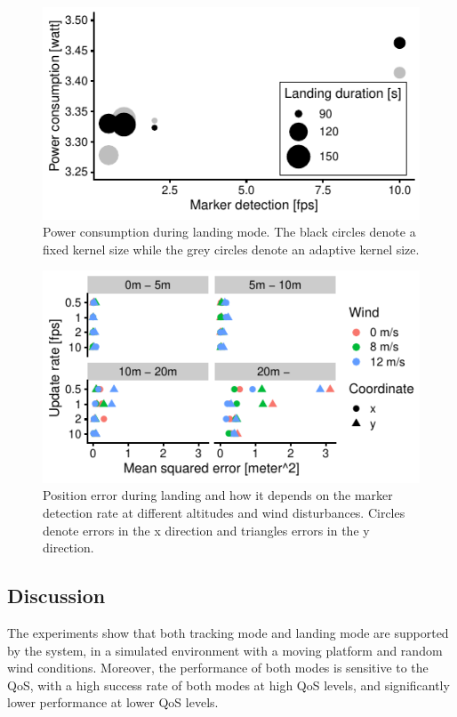 \documentclass[conference, onecolumn, draftclsnofoot]{IEEEtran}
\begin{document}
\begin{figure}[t]
\centering
\includegraphics{data_visualization/PowerLanding.pdf}
\caption{Power consumption during landing mode. 
The black circles denote a fixed kernel size while the grey circles denote an adaptive kernel size.}
\label{fig:PowerDuringLanding}
\end{figure}

\begin{figure}[t]
\centering
\includegraphics{data_visualization/QoSLanding.pdf}
\caption{Position error during landing and how it depends 
on the marker detection rate at different altitudes and wind disturbances.
Circles denote errors in the x direction and triangles 
errors in the y direction.}
\label{fig:PositionErrorDuringLanding}
\end{figure}

\subsection{Discussion}

The experiments show that both tracking mode and landing mode are
supported by the system, in a simulated environment with a moving
platform and random wind conditions. Moreover, the performance of both
modes is sensitive to the QoS, with a high success rate of both modes
at high QoS levels, and significantly lower performance at lower QoS
levels.
\end{document}

